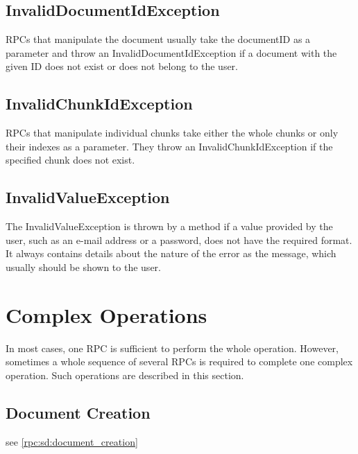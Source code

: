 \subsection{InvalidDocumentIdException}

RPCs that manipulate the document usually take the documentID as a parameter and throw an InvalidDocumentIdException if a document with the given ID does not exist or does not belong to the user.

\subsection{InvalidChunkIdException}

RPCs that manipulate individual chunks take either the whole chunks or only their indexes as a parameter. They throw an InvalidChunkIdException if the specified chunk does not exist.

\subsection{InvalidValueException}

The InvalidValueException is thrown by a method if a value provided by the user, such as an e-mail address or a password, does not have the required format. It always contains details about the nature of the error as the message, which usually should be shown to the user.

\section{Complex Operations}

In most cases, one RPC is sufficient to perform the whole operation. However, sometimes a whole sequence of several RPCs is required to complete one complex operation. Such operations are described in this section.

\subsection{Document Creation}

see \ref{rpc:sd:document_creation}



